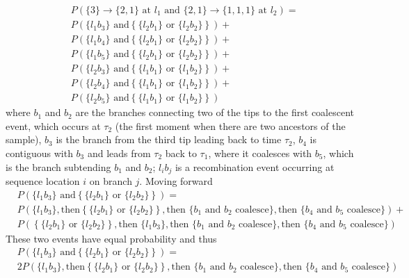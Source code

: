 \documentclass[reqno]{amsart}
\begin{document}
\begin{align}
	& P(\{3\} \rightarrow \{2,1\} \text{ at } l_1 \text{ and } \{2,1\} \rightarrow \{1,1,1\} \text{ at } l_2) = \\
	& P(\{l_1b_3\} \text{ and} \left\{\{l_2b_1\} \text{ or } \{l_2b_2\}\right\}) + \\
	& P(\{l_1b_4\} \text{ and} \left\{\{l_2b_1\} \text{ or } \{l_2b_2\}\right\}) + \\
	& P(\{l_1b_5\} \text{ and} \left\{\{l_2b_1\} \text{ or } \{l_2b_2\}\right\}) + \\
	& P(\{l_2b_3\} \text{ and} \left\{\{l_1b_1\} \text{ or } \{l_1b_2\}\right\}) + \\
	& P(\{l_2b_4\} \text{ and} \left\{\{l_1b_1\} \text{ or } \{l_1b_2\}\right\}) + \\
	& P(\{l_2b_5\} \text{ and} \left\{\{l_1b_1\} \text{ or } \{l_1b_2\}\right\})
\end{align}
where $b_1$ and $b_2$ are the branches connecting two of the tips to the first coalescent event, which occurs at $\tau_2$ (the first moment when there are two ancestors of the sample), $b_3$ is the branch from the third tip leading back to time $\tau_2$, $b_4$ is contiguous with $b_3$ and leads from $\tau_2$ back to $\tau_1$, where it coalesces with $b_5$, which is the branch subtending $b_1$ and $b_2$; $l_ib_j$ is a recombination event occurring at sequence location $i$ on branch $j$. Moving forward
\begin{align}
	& P(\{l_1b_3\} \text{ and} \left\{\{l_2b_1\} \text{ or } \{l_2b_2\}\right\}) = \\
	& P(\{l_1 b_3\}, \text{then} \left\{\{l_2 b_1\} \text{ or } \{l_2 b_2\}\right\}, \text{then } \{b_1\text{ and } b_2 \text{ coalesce}\}, \text{then } \{b_4 \text{ and } b_5 \text{ coalesce}\}) + \\
	& P(\left\{\{l_2 b_1\} \text{ or } \{l_2 b_2\}\right\}, \text{then } \{l_1 b_3\}, \text{then } \{b_1\text{ and } b_2 \text{ coalesce}\}, \text{then } \{b_4 \text{ and } b_5 \text{ coalesce}\})
\end{align}
These two events have equal probability and thus
\begin{align}
		& P(\{l_1b_3\} \text{ and} \left\{\{l_2b_1\} \text{ or } \{l_2b_2\}\right\}) = \\
		& 2P(\{l_1 b_3\}, \text{then} \left\{\{l_2 b_1\} \text{ or } \{l_2 b_2\}\right\}, \text{then } \{b_1\text{ and } b_2 \text{ coalesce}\}, \text{then } \{b_4 \text{ and } b_5 \text{ coalesce}\})
\end{align}
\end{document}
